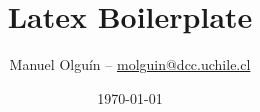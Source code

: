 \documentclass[12pt]{article}
\title{Latex Boilerplate}
\author{Manuel Olguín -- \href{mailto:molguin@dcc.uchile.cl}{molguin@dcc.uchile.cl}}
\date{\today}
\begin{document}
\maketitle

\lipsum[1]\autocite{olguin2018}

\printbibliography%
\end{document}
